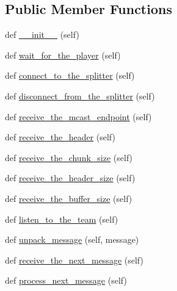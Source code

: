 \subsection*{Public Member Functions}
\begin{DoxyCompactItemize}
\item 
def \hyperlink{classsrc_1_1core_1_1peer__ims_1_1Peer__IMS_a525c10b59682da32a7502314bd4b1f5e}{\+\_\+\+\_\+init\+\_\+\+\_\+} (self)
\item 
def \hyperlink{classsrc_1_1core_1_1peer__ims_1_1Peer__IMS_ab8ab41fb26aaa0d44235a5a7dfcba6b5}{wait\+\_\+for\+\_\+the\+\_\+player} (self)
\item 
def \hyperlink{classsrc_1_1core_1_1peer__ims_1_1Peer__IMS_a2071b641d1a934130e33f6de44e23a2d}{connect\+\_\+to\+\_\+the\+\_\+splitter} (self)
\item 
def \hyperlink{classsrc_1_1core_1_1peer__ims_1_1Peer__IMS_a27d57f696759788043cc6b166fc13855}{disconnect\+\_\+from\+\_\+the\+\_\+splitter} (self)
\item 
def \hyperlink{classsrc_1_1core_1_1peer__ims_1_1Peer__IMS_a4351f780525246f64f8d18d494ccbd8d}{receive\+\_\+the\+\_\+mcast\+\_\+endpoint} (self)
\item 
def \hyperlink{classsrc_1_1core_1_1peer__ims_1_1Peer__IMS_a0880486948cf97e67fff032e93f54f32}{receive\+\_\+the\+\_\+header} (self)
\item 
def \hyperlink{classsrc_1_1core_1_1peer__ims_1_1Peer__IMS_a3e1d60b49169056d27193917740dc625}{receive\+\_\+the\+\_\+chunk\+\_\+size} (self)
\item 
def \hyperlink{classsrc_1_1core_1_1peer__ims_1_1Peer__IMS_ae7993f21d5127ea020cebc00e95012de}{receive\+\_\+the\+\_\+header\+\_\+size} (self)
\item 
def \hyperlink{classsrc_1_1core_1_1peer__ims_1_1Peer__IMS_aa3778cc26a31a96f7624466c855edcbb}{receive\+\_\+the\+\_\+buffer\+\_\+size} (self)
\item 
def \hyperlink{classsrc_1_1core_1_1peer__ims_1_1Peer__IMS_a701dfdceeb9b0eeb56b9fb42176e8e39}{listen\+\_\+to\+\_\+the\+\_\+team} (self)
\item 
def \hyperlink{classsrc_1_1core_1_1peer__ims_1_1Peer__IMS_a117a1ce826a5599d5bd2c365de57d240}{unpack\+\_\+message} (self, message)
\item 
def \hyperlink{classsrc_1_1core_1_1peer__ims_1_1Peer__IMS_a8102399ab64bde214354188129bf92e9}{receive\+\_\+the\+\_\+next\+\_\+message} (self)
\item 
def \hyperlink{classsrc_1_1core_1_1peer__ims_1_1Peer__IMS_a85dc71bbe56d2d543c700733a4603ce0}{process\+\_\+next\+\_\+message} (self)

\end{DoxyCompactItemize}
